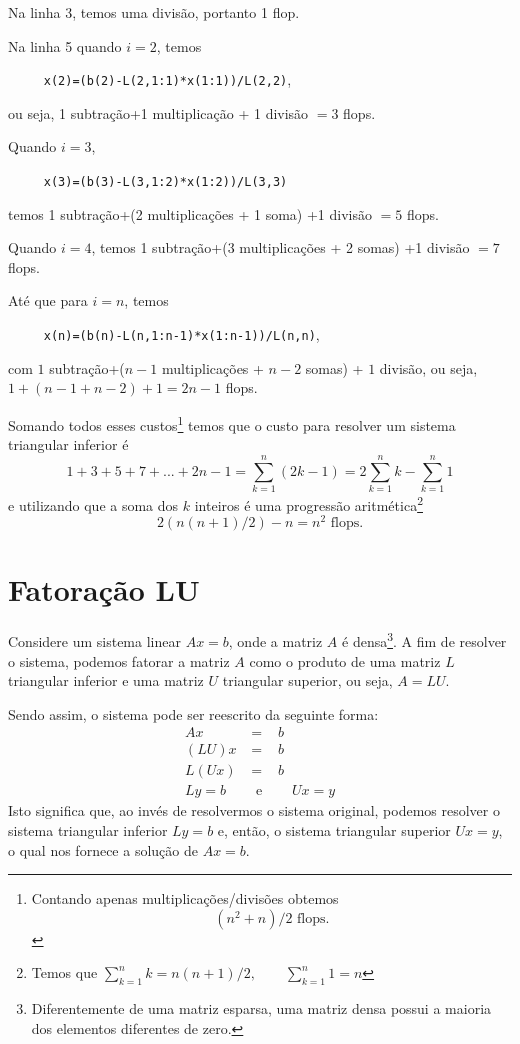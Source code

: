 Na linha 3, temos uma divisão, portanto 1 flop.

Na linha 5 quando $i=2$, temos

\verb#     x(2)=(b(2)-L(2,1:1)*x(1:1))/L(2,2)#,

ou seja, 1 subtração+1 multiplicação + 1 divisão $=3$ flops.

Quando $i=3$,

\verb#     x(3)=(b(3)-L(3,1:2)*x(1:2))/L(3,3)#

temos 1 subtração+(2 multiplicações + 1 soma) +1 divisão $=5$ flops.

Quando $i=4$, temos 1 subtração+(3 multiplicações + 2 somas) +1 divisão $=7$ flops.

Até que para $i=n$, temos

\verb#     x(n)=(b(n)-L(n,1:n-1)*x(1:n-1))/L(n,n)#,

com $1$ subtração+($n-1$ multiplicações + $n-2$ somas) + $1$ divisão, ou seja, $1+(n-1+n-2)+1=2n-1$ flops.

Somando todos esses custos\footnote{Contando apenas multiplicações/divisões obtemos
\begin{equation}
  (n^2+n)/2  \text{~flops}.
\end{equation}} temos que o custo para resolver um sistema triangular inferior é
\begin{equation}
  1 +3+5+7+...+2n-1=  \sum_{k=1}^n(2k-1) = 2 \sum_{k=1}^nk -\sum_{k=1}^n1
\end{equation}
e utilizando que a soma dos $k$ inteiros é uma progressão aritmética\footnote{Temos que $\displaystyle \sum_{k=1}^n k =n(n+1)/2, \quad\quad \sum_{k=1}^n 1=n$}
\begin{equation}
  2 ( n(n+1)/2 ) -n=  n^2 \text{~flops}.
\end{equation}
\fi


\section{Fatoração LU}
Considere um sistema linear $Ax = b$, onde a matriz $A$ é densa\footnote{Diferentemente de uma matriz esparsa, uma matriz densa possui a maioria dos elementos diferentes de zero.}. A fim de resolver o sistema, podemos fatorar a matriz $A$ como o produto de uma matriz $L$ triangular inferior e uma matriz $U$ triangular superior, ou seja, $A=LU$.

Sendo assim, o sistema pode ser reescrito da seguinte forma:
\begin{eqnarray*}
  Ax &=&b \\
  (LU)x &=&b \\
  L(Ux) &=&b \\
  L y = b \quad & \text{ e }& \quad Ux=y
\end{eqnarray*}
Isto significa que, ao invés de resolvermos o sistema original, podemos resolver o sistema triangular inferior $Ly=b$ e, então, o sistema triangular superior $Ux = y$, o qual nos fornece a solução de $Ax = b$.

